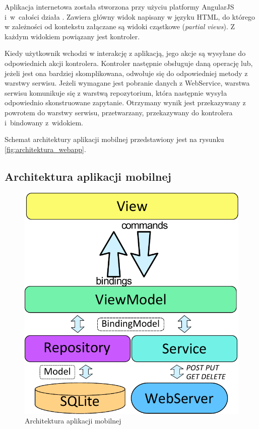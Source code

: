 \documentclass{book}
\begin{document}
			Aplikacja internetowa została stworzona przy użyciu platformy AngularJS i~w~całości działa . Zawiera główny widok napisany w języku HTML, do którego w zależności od kontekstu załączane są widoki cząstkowe (\emph{partial views}). Z każdym widokiem powiązany jest kontroler. 
			
			Kiedy użytkownik wchodzi w interakcję z aplikacją, jego akcje są wysyłane do odpowiednich akcji kontrolera. Kontroler następnie obsługuje daną operację lub, jeżeli jest ona bardziej skomplikowana, odwołuje się do odpowiedniej metody z warstwy serwisu. Jeżeli wymagane jest pobranie danych z WebService, warstwa serwisu komunikuje się z warstwą repozytorium, która następnie wysyła odpowiednio skonstruowane zapytanie. Otrzymany wynik jest przekazywany z powrotem do warstwy serwisu, przetwarzany, przekazywany do kontrolera i~bindowany z~widokiem.								

			Schemat architektury aplikacji mobilnej przedstawiony jest na rysunku \ref{fig:architektura_webapp}.			
			
			\subsection{Architektura aplikacji mobilnej}
			\label{sec:ArchitekturaAplikacjiMobilnej}	
			
			\begin{figure}
				\centering
				\includegraphics[width=1\textwidth]{architektura_mobile.pdf}
				\caption{Architektura aplikacji mobilnej}
				\label{fig:architektura_mobile}
			\end{figure}
			
\end{document}
